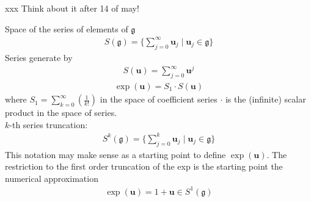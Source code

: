 xxx Think about it after 14 of may!

Space of the series of elements of $\mathfrak{g}$
\begin{align*}
S(\mathfrak{g}) = \{ \sum_{j=0}^{\infty} \mathbf{u}_{j} \mid \mathbf{u}_{j} \in \mathfrak{g}  \}
\end{align*}
Series generate by 
\begin{align*}
S(\mathbf{u}) =\sum_{j=0}^{\infty} \mathbf{u}^{j} 
\end{align*}
\begin{align*}
\exp(\mathbf{u}) = S_1  \cdot S(\mathbf{u}) 
\end{align*}
where $S_1 = \sum_{k=0}^{\infty} (\frac{1}{k!})$ in the space of coefficient series $\cdot $ is the (infinite) scalar product in the space of series.\\
$k$-th series truncation:
\begin{align*}
S^{k}(\mathfrak{g})  = \{ \sum_{j=0}^{k} \mathbf{u}_{j} \mid \mathbf{u}_{j} \in \mathfrak{g}  \}
\end{align*}
This notation may make sense as a starting point to define $\exp(\mathbf{u})$. 
The restriction to the first order truncation of the exp is the starting point the numerical approximation
\begin{align*}
\exp(\mathbf{u}) = 1 + \mathbf{u} \in S^{1}(\mathfrak{g}) 
\end{align*}